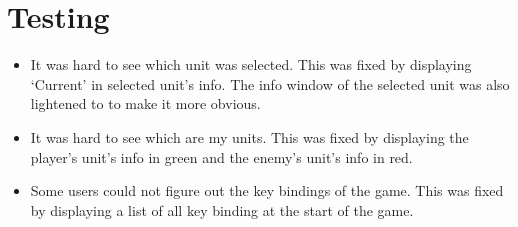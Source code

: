 \section{Testing}
\begin{itemize}
	\item It was hard to see which unit was selected. This was fixed by  displaying `Current' in selected unit's info. The info window of the selected unit was also lightened to to make it more obvious.
	
	\item It was hard to see which are my units. This was fixed by displaying the player's unit's info in green and the enemy's unit's info in red. 
	
	\item Some users could not figure out the key bindings of the game. This was fixed by displaying a list of all key binding at the start of the game.
\end{itemize}
